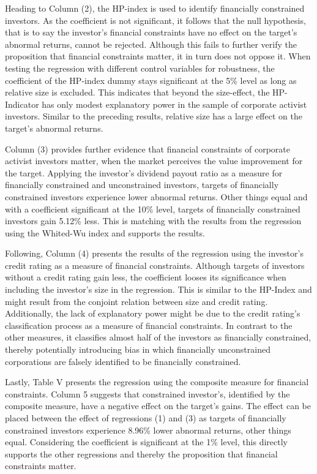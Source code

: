 \documentclass[12pt]{article}
\begin{document}
Heading to Column (2), the HP-index is used to identify financially constrained investors. As the coefficient is not significant, it follows that the null hypothesis, that is to say the investor's financial constraints have no effect on the target's abnormal returns, cannot be rejected. Although this fails to further verify the proposition that financial constraints matter, it in turn does not oppose it. When testing the regression with different control variables for robustness, the coefficient of the HP-index dummy stays significant at the 5\% level as long as relative size is excluded. This indicates that beyond the size-effect, the HP-Indicator has only modest explanatory power in the sample of corporate activist investors. Similar to the preceding results, relative size has a large effect on the target's abnormal returns.\par
Column (3) provides further evidence that financial constraints of corporate activist investors matter, when the market perceives the value improvement for the target. Applying the investor's dividend payout ratio as a measure for financially constrained and unconstrained investors, targets of financially constrained investors experience lower abnormal returns. Other things equal and with a coefficient significant at the 10\% level, targets of financially constrained investors gain 5.12\% less. This is matching with the results from the regression using the Whited-Wu index and supports the results.\par
Following, Column (4) presents the results of the regression using the investor's credit rating as a measure of financial constraints. Although targets of investors without a credit rating gain less, the coefficient looses its significance when including the investor's size in the regression. This is similar to the HP-Index and might result from the conjoint relation between size and credit rating. Additionally, the lack of explanatory power might be due to the credit rating's classification process as a measure of financial constraints. In contrast to the other measures, it classifies almost half of the investors as financially constrained, thereby potentially introducing bias in which financially unconstrained corporations are falsely identified to be financially constrained.\par
Lastly, Table V presents the regression using the composite measure for financial constraints. Column 5 suggests that constrained investor's, identified by the composite measure, have a negative effect on the target's gains. The effect can be placed between the effect of regressions (1) and (3) as targets of financially constrained investors experience 8.96\% lower abnormal returns, other things equal. Considering the coefficient is significant at the 1\% level, this directly supports the other regressions and thereby the proposition that financial constraints matter.\par
\end{document}
